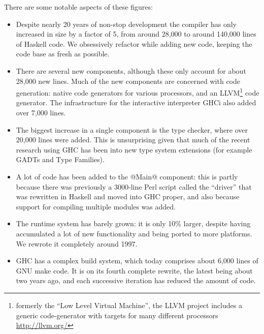 \documentclass{article}
\let\cite=\citep
\begin{document}
There are some notable aspects of these figures:

\begin{itemize}
\item Despite nearly 20 years of non-stop development the compiler has only
  increased in size by a factor of 5, from around 28,000 to around
  140,000 lines of Haskell code.  We obsessively refactor while adding new code,
  keeping the code base as fresh as possible.

\item There are several new components, although these only account
  for about 28,000 new lines.  Much of the new components are
  concerned with code generation: native code generators for various
  processors, and an LLVM\footnote{formerly the ``Low Level Virtual
    Machine'', the LLVM project includes a generic code-generator with
    targets for many different processors \url{http://llvm.org/}} code generator.  The
  infrastructure for the interactive interpreter GHCi also added over
  7,000 lines.

\item The biggest increase in a single component is the type checker,
  where over 20,000 lines were added.  This is unsurprising given that
  much of the recent research using GHC has been into new type
  system extensions (for example GADTs\cite{gadts} and Type Families\cite{type-families}).

\item A lot of code has been added to the @Main@ component: this is
  partly because there was previously a 3000-line Perl script
  called the ``driver'' that was rewritten in Haskell and moved into
  GHC proper, and also because support for compiling multiple modules
  was added.

\item The runtime system has barely grown: it is only 10\% larger,
  despite having accumulated a lot of new functionality and being
  ported to more platforms.  We rewrote it completely around 1997.

\item GHC has a complex build system, which today comprises about
  6,000 lines of GNU make code.  It is on its fourth complete rewrite,
  the latest being about two years ago, and each successive iteration
  has reduced the amount of code.
\end{itemize}
\end{document}
